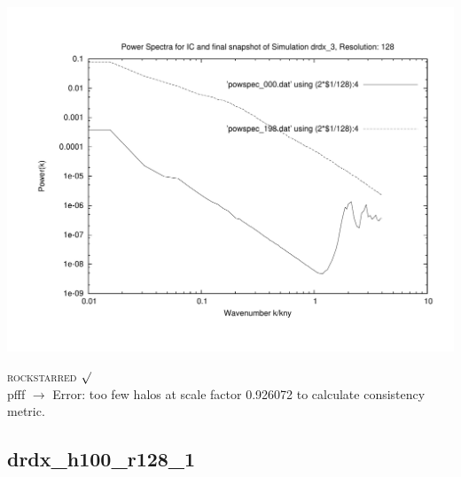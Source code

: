\includegraphics[scale=0.5]{r128/h100/drdx_3/plot_powspec_drdx_3.pdf}


\textsc{rockstarred} $\surd$  \\
pfff $\rightarrow$ Error: too few halos at scale factor 0.926072 to calculate consistency metric.

\newpage
\subsection{drdx\_h100\_r128\_1}

